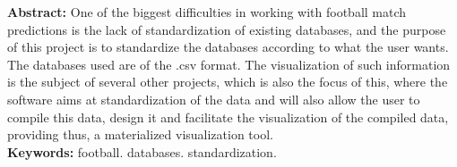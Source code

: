 \begin{singlespace}
\textbf{Abstract: }
One of the biggest difficulties in working with football match predictions is the lack of standardization of existing databases, and the purpose of this project is to standardize the databases according to what the user wants. The databases used are of the .csv format. The visualization of such information is the subject of several other projects, which is also the focus of this, where the software aims at standardization of the data and will also allow the user to compile this data, design it and facilitate the visualization of the compiled data, providing thus, a materialized visualization tool.\\
\textbf{Keywords: }
football. databases. standardization.
\end{singlespace}